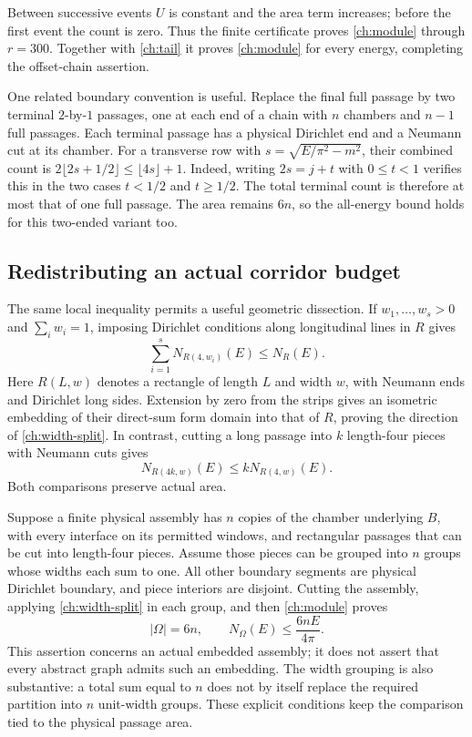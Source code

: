 \documentclass[11pt,reqno]{amsart}
\numberwithin{equation}{section}
\newcommand{\abs}[1]{\lvert#1\rvert}
\newcommand{\Om}{\Omega}
\begin{document}
Between successive events $U$ is constant and the area term
increases; before the first event the count is zero. Thus the
finite certificate proves \eqref{ch:module} through $r=300$.
Together with \eqref{ch:tail} it proves \eqref{ch:module} for
every energy, completing the offset-chain assertion.

One related boundary convention is useful. Replace the final
full passage by two terminal $2$-by-$1$ passages, one at each
end of a chain with $n$ chambers and $n-1$ full passages. Each
terminal passage has a physical Dirichlet end and a Neumann cut
at its chamber. For a transverse row with
$s=\sqrt{E/\pi^2-m^2}$, their combined count is
$2\lfloor2s+1/2\rfloor\le\lfloor4s\rfloor+1$.
Indeed, writing $2s=j+t$ with $0\le t<1$ verifies this in the
two cases $t<1/2$ and $t\ge1/2$. The total terminal count is
therefore at most that of one full passage. The area remains
$6n$, so the all-energy bound holds for this two-ended variant too.

\subsection{Redistributing an actual corridor budget}

The same local inequality permits a useful geometric dissection.
If $w_1,\ldots,w_s>0$ and $\sum_iw_i=1$, imposing Dirichlet
conditions along longitudinal lines in $R$ gives
\begin{equation}\label{ch:width-split}
 \sum_{i=1}^s N_{R(4,w_i)}(E)\le N_R(E).
\end{equation}
Here $R(L,w)$ denotes a rectangle of length $L$ and width $w$,
with Neumann ends and Dirichlet long sides. Extension by zero
from the strips gives an isometric embedding of their direct-sum
form domain into that of $R$, proving the direction of
\eqref{ch:width-split}. In contrast, cutting a long passage into
$k$ length-four pieces with Neumann cuts gives
\begin{equation}\label{ch:length-split}
 N_{R(4k,w)}(E)\le kN_{R(4,w)}(E).
\end{equation}
Both comparisons preserve actual area.

Suppose a finite physical assembly has $n$ copies of the chamber
underlying $B$, with every interface on its permitted windows,
and rectangular passages that can be cut into length-four pieces.
Assume those pieces can be grouped into $n$ groups whose widths
each sum to one. All other boundary segments are physical
Dirichlet boundary, and piece interiors are disjoint. Cutting
the assembly, applying \eqref{ch:width-split} in each group,
and then \eqref{ch:module} proves
\[
 \abs\Om=6n,\qquad N_\Om(E)\le\frac{6nE}{4\pi}.
\]
This assertion concerns an actual embedded assembly; it does
not assert that every abstract graph admits such an embedding.
The width grouping is also substantive: a total sum equal to
$n$ does not by itself replace the required partition into
$n$ unit-width groups. These explicit conditions keep the
comparison tied to the physical passage area.
\end{document}
